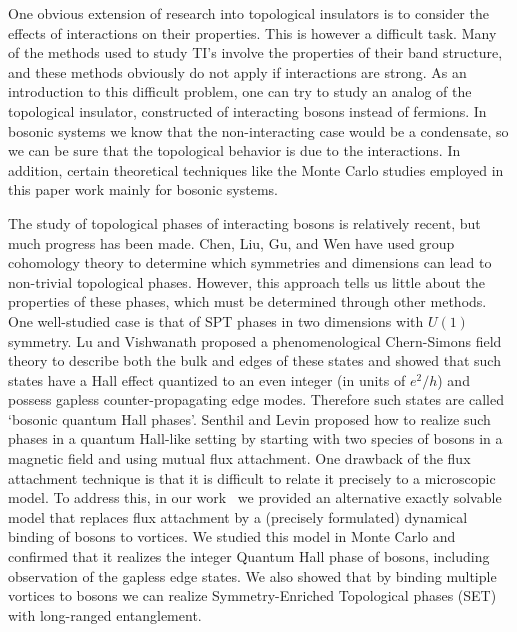 \documentclass[prb,twocolumn]{revtex4-1}
\begin{document}
One obvious extension of research into topological insulators is to consider the effects of interactions on their properties. This is however a difficult task. Many of the methods used to study TI's involve the properties of their band structure, and these methods obviously do not apply if interactions are strong. As an introduction to this difficult problem, one can try to study an analog of the topological insulator, constructed of interacting bosons instead of fermions. In bosonic systems we know that the non-interacting case would be a condensate, so we can be sure that the topological behavior is due to the interactions. In addition, certain theoretical techniques like the Monte Carlo studies employed in this paper work mainly for bosonic systems.

The study of topological phases of interacting bosons is relatively recent, but much progress has been made. Chen, Liu, Gu, and Wen\cite{WenScience,*WenPRB} have used group cohomology theory to determine which symmetries and dimensions can lead to non-trivial topological phases. However, this approach tells us little about the properties of these phases, which must be determined through other methods. One well-studied case is that of SPT phases in two dimensions with $U(1)$ symmetry. Lu and Vishwanath\cite{LuVishwanath} proposed a phenomenological Chern-Simons field theory to describe both the bulk and edges of these states and showed that such states have a Hall effect quantized to an even integer (in units of $e^2/h$) and possess gapless counter-propagating edge modes. Therefore such states are called `bosonic quantum Hall phases'. Senthil and Levin\cite{SenthilLevin} proposed how to realize such phases in a quantum Hall-like setting by starting with two species of bosons in a magnetic field and using mutual flux attachment.  One drawback of the flux attachment technique is that it is difficult to relate it precisely to a microscopic model.  To address this, in our work~ we provided an alternative exactly solvable model that replaces flux attachment by a (precisely formulated) dynamical binding of bosons to vortices.  We studied this model in Monte Carlo and confirmed that it realizes the integer Quantum Hall phase of bosons, including observation of the gapless edge states.  We also showed that by binding multiple vortices to bosons we can realize Symmetry-Enriched Topological phases (SET) with long-ranged entanglement.
\end{document}
